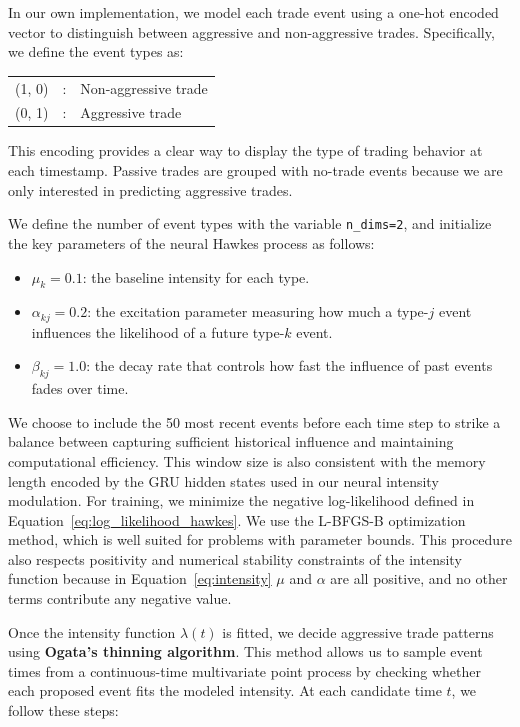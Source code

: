 In our own implementation, we model each trade event using a one-hot encoded vector to distinguish between aggressive and non-aggressive trades. Specifically, we define the event types as:
\begin{center}
\begin{tabular}{lll}
(1, 0) & : & Non-aggressive trade \\
(0, 1) & : & Aggressive trade \\
\end{tabular}
\end{center}
This encoding provides a clear way to display the type of trading behavior at each timestamp. Passive trades are grouped with no-trade events because we are only interested in predicting aggressive trades.

We define the number of event types with the variable \texttt{n\_dims=2}, and initialize the key parameters of the neural Hawkes process as follows:

\begin{itemize}
    \item \( \mu_k = 0.1 \): the baseline intensity for each type.
    \item \( \alpha_{kj} = 0.2 \): the excitation parameter measuring how much a type-\( j \) event influences the likelihood of a future type-\( k \) event.
    \item \( \beta_{kj} = 1.0 \): the decay rate that controls how fast the influence of past events fades over time.
\end{itemize}

We choose to include the 50 most recent events before each time step to strike a balance between capturing sufficient historical influence and maintaining computational efficiency. This window size is also consistent with the memory length encoded by the GRU hidden states used in our neural intensity modulation. For training, we minimize the negative log-likelihood defined in Equation~\ref{eq:log_likelihood_hawkes}. We use the L-BFGS-B optimization method, which is well suited for problems with parameter bounds. This procedure also respects positivity and numerical stability constraints of the intensity function because in Equation~\ref{eq:intensity} $\mu$ and $\alpha$ are all positive, and no other terms contribute any negative value.

Once the intensity function \( \lambda(t) \) is fitted, we decide aggressive trade patterns using \textbf{Ogata's thinning algorithm}. This method allows us to sample event times from a continuous-time multivariate point process by checking whether each proposed event fits the modeled intensity. At each candidate time \( t \), we follow these steps:


